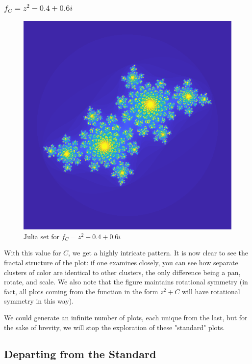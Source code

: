 \documentclass[12pt]{article}
\begin{document}
\subsubsection{$f_C = z^2 - 0.4 + 0.6i$} 

\begin{figure}[H]
	\centering
	\includegraphics[scale=0.5]{Ceqm0406.png}
	\caption{Julia set for $f_C = z^2 - 0.4 + 0.6i$}
\end{figure}

With this value for $C$, we get a highly intricate pattern. It is now clear to see the fractal structure of the plot: if one examines closely, you can see how separate clusters of color are identical to other clusters, the only difference being a pan, rotate, and scale. We also note that the figure maintains rotational symmetry (in fact, all plots coming from the function in the form $z^2 + C$ will have rotational symmetry in this way). 

We could generate an infinite number of plots, each unique from the last, but for the sake of brevity, we will stop the exploration of these "standard" plots. 

\subsection{Departing from the Standard}
\end{document}
